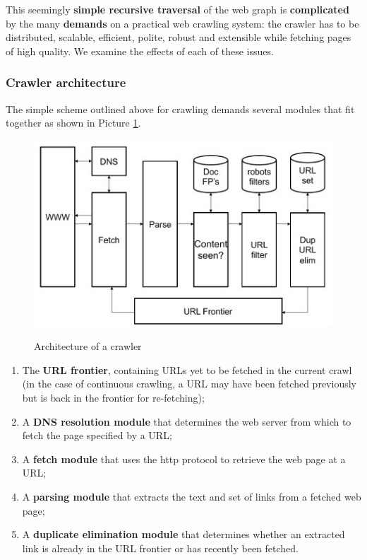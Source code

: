 This seemingly \textbf{simple recursive traversal} of the web graph is \textbf{complicated} by the many \textbf{demands} on a practical web crawling system: the crawler has to be distributed, scalable, efficient, polite, robust and extensible while fetching pages of high quality. We examine the effects of each of these issues. 

\subsubsection{Crawler architecture}
The simple scheme outlined above for crawling demands several modules that fit together as shown in Picture \ref{crawler arch}.

\begin{figure}[h!]
		\centering
		\includegraphics[scale = 1.6]{img/crawler architecture.jpg}
		\label{crawler arch}
        \caption{Architecture of a crawler}
\end{figure}

\begin{enumerate}
    \item The \textbf{URL frontier}, containing URLs yet to be fetched in the current crawl (in the case of continuous crawling, a URL may have been fetched previously but is back in the frontier for re-fetching);
    \item A \textbf{DNS resolution module} that determines the web server from which to fetch the page specified by a URL;
    \item  A \textbf{fetch module} that uses the http protocol to retrieve the web page at a URL;
    \item A \textbf{parsing module} that extracts the text and set of links from a fetched web page;
    \item A \textbf{duplicate elimination module} that determines whether an extracted link is already in the URL frontier or has recently been fetched.
\end{enumerate}

